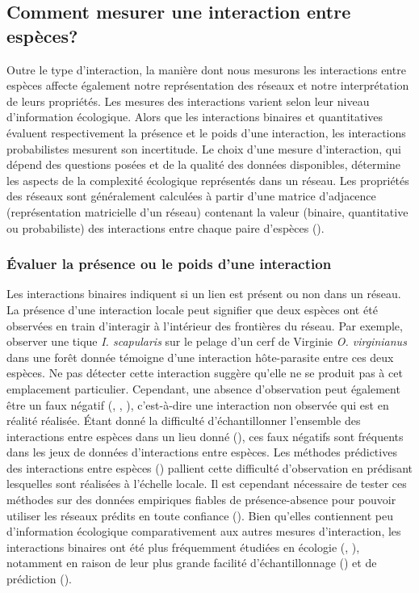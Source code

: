 \subsection{Comment mesurer une interaction entre espèces?} 

Outre le type d'interaction, la manière dont nous mesurons les interactions
entre espèces affecte également notre représentation des réseaux et notre
interprétation de leurs propriétés. Les mesures des interactions varient selon
leur niveau d'information écologique. Alors que les interactions binaires et
quantitatives évaluent respectivement la présence et le poids d'une interaction,
les interactions probabilistes mesurent son incertitude. Le choix d'une mesure
d'interaction, qui dépend des questions posées et de la qualité des données
disponibles, détermine les aspects de la complexité écologique représentés dans
un réseau. Les propriétés des réseaux sont généralement calculées à partir d'une
matrice d'adjacence (représentation matricielle d'un réseau) contenant la valeur
(binaire, quantitative ou probabiliste) des interactions entre chaque paire
d'espèces (\cite{Delmas2019Analysing}).

\subsubsection{Évaluer la présence ou le poids d'une interaction} 

Les interactions binaires indiquent si un lien est présent ou non dans un
réseau. La présence d'une interaction locale peut signifier que deux espèces ont
été observées en train d'interagir à l'intérieur des frontières du réseau. Par
exemple, observer une tique \textit{I. scapularis} sur le pelage d'un cerf de
Virginie \textit{O. virginianus} dans une forêt donnée témoigne d'une
interaction hôte-parasite entre ces deux espèces. Ne pas détecter cette
interaction suggère qu'elle ne se produit pas à cet emplacement particulier.
Cependant, une absence d'observation peut également être un faux négatif
(\cite{Bluthgen2010Why}, \cite{Chacoff2012Evaluating}, \cite{Stock2017Linear}),
c'est-à-dire une interaction non observée qui est en réalité réalisée. Étant
donné la difficulté d'échantillonner l'ensemble des interactions entre espèces
dans un lieu donné (\cite{Jordano2016Sampling}), ces faux négatifs sont
fréquents dans les jeux de données d'interactions entre espèces. Les méthodes
prédictives des interactions entre espèces (\cite{Strydom2021Roadmapa}) pallient
cette difficulté d'observation en prédisant lesquelles sont réalisées à
l'échelle locale. Il est cependant nécessaire de tester ces méthodes sur des
données empiriques fiables de présence-absence pour pouvoir utiliser les réseaux
prédits en toute confiance (\cite{Brimacombe2024Applying}). Bien qu'elles
contiennent peu d'information écologique comparativement aux autres mesures
d'interaction, les interactions binaires ont été plus fréquemment étudiées en
écologie (\cite{Pascual2006Ecological}, \cite{Delmas2019Analysing}), notamment
en raison de leur plus grande facilité d'échantillonnage
(\cite{Jordano2016Sampling}) et de prédiction (\cite{Strydom2021Roadmapa}).

